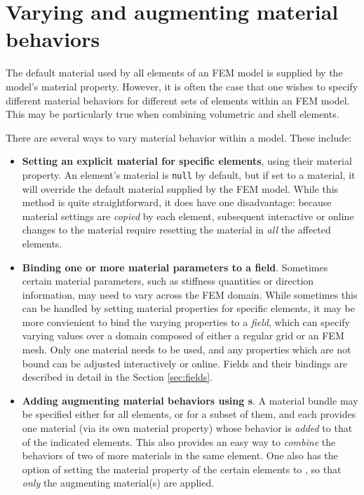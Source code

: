 \section{Varying and augmenting material behaviors}
\label{sec:augmentingMaterials}

The default material used by all elements of an FEM model is supplied
by the model's {\sf material} property.  However, it is often the case
that one wishes to specify different material behaviors for
different sets of elements within an FEM model. This may be
particularly true when combining volumetric and shell elements.

There are several ways to vary material behavior within a model.
These include:

\begin{itemize}

\item {\bf Setting an explicit material for specific elements}, using
their {\sf material} property.  An element's material is {\tt null} by
default, but if set to a material, it will override the
default material supplied by the FEM model. While this method is quite
straightforward, it does have one disadvantage: because material
settings are {\it copied} by each element, subsequent interactive or
online changes to the material require resetting the material in {\it all}
the affected elements.

\item {\bf Binding one or more material parameters to a field}.
Sometimes certain material parameters, such as stiffness quantities or
direction information, may need to vary across the FEM domain.  While
sometimes this can be handled by setting material properties for
specific elements, it may be more convienient to bind the varying
properties to a {\it field}, which can specify varying values over a
domain composed of either a regular grid or an FEM mesh.  Only one
material needs to be used, and any properties which are not bound can
be adjusted interactively or online. Fields and their bindings are
described in detail in the Section \ref{sec:fields}.

\item {\bf Adding augmenting material behaviors using 
s}.  A material
bundle may be specified either for all elements, or for a subset of
them, and each provides one material (via its own {\sf material}
property) whose behavior is {\it added} to that of the indicated
elements. This also provides an easy way to {\it combine} the
behaviors of two of more materials in the same element.  One also has
the option of setting the {\sf material} property of the certain
elements to , so
that {\it only} the augmenting material(s) are applied.


\end{itemize}
